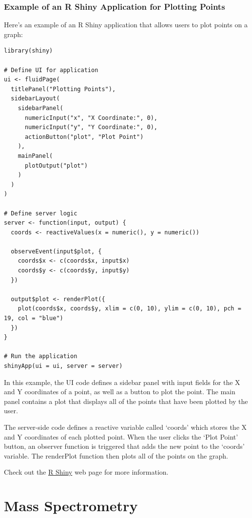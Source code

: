 \documentclass[
]{book}
\begin{document}
\hypertarget{example-of-an-r-shiny-application-for-plotting-points}{%
\subsection*{Example of an R Shiny Application for Plotting Points}\label{example-of-an-r-shiny-application-for-plotting-points}}

Here's an example of an R Shiny application that allows users to plot points on a graph:

\begin{verbatim}
library(shiny)

# Define UI for application
ui <- fluidPage(
  titlePanel("Plotting Points"),
  sidebarLayout(
    sidebarPanel(
      numericInput("x", "X Coordinate:", 0),
      numericInput("y", "Y Coordinate:", 0),
      actionButton("plot", "Plot Point")
    ),
    mainPanel(
      plotOutput("plot")
    )
  )
)

# Define server logic
server <- function(input, output) {
  coords <- reactiveValues(x = numeric(), y = numeric())

  observeEvent(input$plot, {
    coords$x <- c(coords$x, input$x)
    coords$y <- c(coords$y, input$y)
  })

  output$plot <- renderPlot({
    plot(coords$x, coords$y, xlim = c(0, 10), ylim = c(0, 10), pch = 19, col = "blue")
  })
}

# Run the application
shinyApp(ui = ui, server = server)
\end{verbatim}

In this example, the UI code defines a sidebar panel with input fields for the X and Y coordinates of a point, as well as a button to plot the point. The main panel contains a plot that displays all of the points that have been plotted by the user.

The server-side code defines a reactive variable called `coords' which stores the X and Y coordinates of each plotted point. When the user clicks the `Plot Point' button, an observer function is triggered that adds the new point to the `coords' variable. The renderPlot function then plots all of the points on the graph.

Check out the \href{https://shiny.rstudio.com/}{R Shiny} web page for more information.

\hypertarget{mass-spectrometry}{%
\chapter{Mass Spectrometry}\label{mass-spectrometry}}
\end{document}
